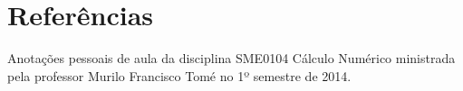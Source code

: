 \section{Referências}

Anotações pessoais de aula da disciplina SME0104 Cálculo Numérico ministrada pela professor Murilo Francisco Tomé no 1º semestre de 2014.
